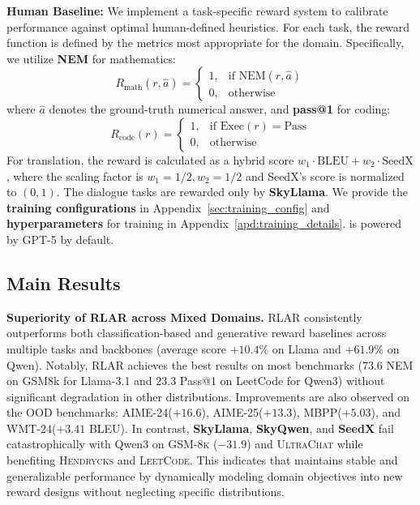 \noindent\textbf{Human Baseline:}
We implement a task-specific reward system to calibrate performance against optimal human-defined heuristics. For each task, the reward function is defined by the metrics most appropriate for the domain. Specifically, we utilize \textbf{NEM} for mathematics:
\[
    R_{\text{math}}(r, \hat{a}) =  \begin{cases}  1, & \text{if } \text{NEM}(r, \hat{a}) \\  0, & \text{otherwise} \end{cases}
\]
where $\hat{a}$ denotes the ground-truth numerical answer,
and \textbf{pass@1} for coding:
\[
R_{\text{code}}(r) =  \begin{cases}  1, & \text{if } \text{Exec}(r) = \text{Pass} \\  0, & \text{otherwise} \end{cases}
\]
For translation, the reward is calculated as a hybrid score \(w_1 \cdot \mathrm{BLEU} + w_2 \cdot \mathrm{SeedX} \), where the scaling factor is $w_1 = 1/2, w_2 = 1/2$ and SeedX's score is normalized to \((0, 1)\). The dialogue tasks are rewarded only by \textbf{SkyLlama}. We provide the \textbf{training configurations} in Appendix~\ref{sec:training_config} and \textbf{hyperparameters} for training in Appendix~\ref{apd:training_details}. \method{} is powered by GPT-5 by default.


\subsection{Main Results}

\noindent\textbf{Superiority of RLAR across Mixed Domains.} \quad
RLAR consistently outperforms both classification-based and generative reward baselines across multiple tasks and backbones (average score \(+10.4\%\) on Llama and \(+61.9\%\) on Qwen). 
Notably, RLAR achieves the best results on most benchmarks ($73.6$ NEM on GSM8k for Llama-3.1 and $23.3$ Pass@1 on LeetCode for Qwen3) without significant degradation in other distributions.
Improvements are also observed on the OOD benchmarks: \textsc{AIME-24}(\(+16.6\)), \textsc{AIME-25}(\(+13.3\)), \textsc{MBPP}(\(+5.03\)), and \textsc{WMT-24}(\(+3.41\) BLEU).
In contrast, \textbf{SkyLlama}, \textbf{SkyQwen}, and \textbf{SeedX} fail catastrophically with Qwen3 on \textsc{GSM-8k} (\(-31.9\)) and \textsc{UltraChat} while benefiting \textsc{Hendrycks} and \textsc{LeetCode}. This indicates that \method{} maintains stable and generalizable performance by dynamically modeling domain objectives into new reward designs without neglecting specific distributions.


